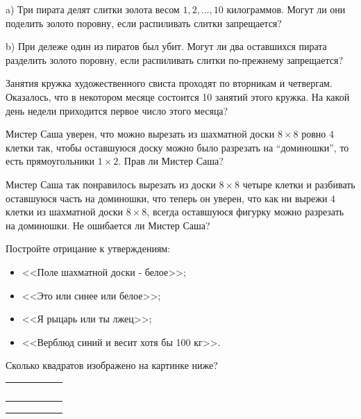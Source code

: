 \documentclass{article}
\begin{document}
\begin{enumerate_boxed}
        \item
        a) Три пирата делят слитки золота весом $1,2,\dots,10$ килограммов.
        Могут ли они поделить золото поровну, если распиливать слитки запрещается?

        b) При дележе один из пиратов был убит.
        Могут ли два оставшихся пирата разделить золото поровну, если распиливать слитки по-прежнему запрещается?

        \item Занятия кружка художественного свиста проходят по вторникам и четвергам.
        Оказалось, что в некотором месяце состоится 10 занятий этого кружка.
        На какой день недели приходится первое число этого месяца?

        \item Мистер Саша уверен, что можно вырезать из шахматной доски $8 \times 8$ ровно $4$ клетки так, чтобы оставшуюся доску можно было разрезать на “доминошки”, то есть прямоугольники $1 \times 2$.
        Прав ли Мистер Саша?

        \item Мистер Саша так понравилось вырезать из доски $8 \times 8$ четыре клетки и разбивать оставшуюся часть на доминошки, что теперь он уверен, что как ни вырежи $4$ клетки из шахматной доски $8 \times 8$, всегда оставшуюся фигурку можно разрезать на доминошки.
        Не ошибается ли Мистер Саша?


        \item Постройте отрицание к утверждениям:
        \begin{itemize}
            \item <<Поле шахматной доски - белое>>;

            \item <<Это или синее или белое>>;

            \item <<Я рыцарь или ты лжец>>;

            \item <<Верблюд синий и весит хотя бы 100 кг>>.
        \end{itemize}

        \item Сколько квадратов изображено на картинке ниже?

        \begin{table}[h]
            \centering
            \begin{tabular}{|c|c|c|c|c|}
                \hline
                \, & \, & \, & \, & \, \\\hline
                &    &    &    &    \\\hline
                &    &    &    &    \\\hline
                &    &    &    &    \\\hline
            \end{tabular}\label{tab:table2}
        \end{table}


\end{enumerate_boxed}
\end{document}
